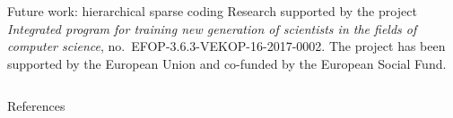 \documentclass{beamer}
\newlength{\onecolwid}
\begin{document}
\begin{frame}[t]
\begin{columns}[t]
\begin{column}{\onecolwid}
\begin{block}{Future work: hierarchical sparse coding}
        {\footnotesize Research supported by the project \emph{Integrated
        program for training new generation of scientists in the fields of computer
        science}, no.~EFOP-3.6.3-VEKOP-16-2017-0002. The project has been supported
        by the European Union and co-funded by the European Social Fund.}
  \end{block}
\end{column} \end{columns} \end{frame} 

  \begin{block}{References}
    \footnotesize
    
     
  \end{block}
\end{document}
